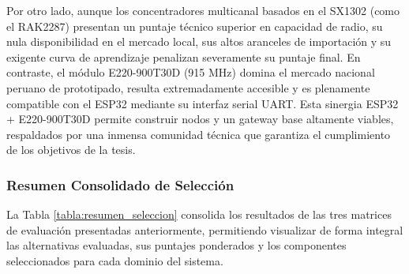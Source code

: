Por otro lado, aunque los concentradores multicanal basados en el SX1302 (como el RAK2287) presentan un puntaje técnico superior en capacidad de radio, su nula disponibilidad en el mercado local, sus altos aranceles de importación y su exigente curva de aprendizaje penalizan severamente su puntaje final. En contraste, el módulo E220-900T30D (915 MHz) domina el mercado nacional peruano de prototipado, resulta extremadamente accesible y es plenamente compatible con el ESP32 mediante su interfaz serial UART. Esta sinergia ESP32 + E220-900T30D permite construir nodos y un gateway base altamente viables, respaldados por una inmensa comunidad técnica que garantiza el cumplimiento de los objetivos de la tesis.

\subsubsection{Resumen Consolidado de Selección}

La Tabla \ref{tabla:resumen_seleccion} consolida los resultados de las tres matrices de evaluación presentadas anteriormente, permitiendo visualizar de forma integral las alternativas evaluadas, sus puntajes ponderados y los componentes seleccionados para cada dominio del sistema.

